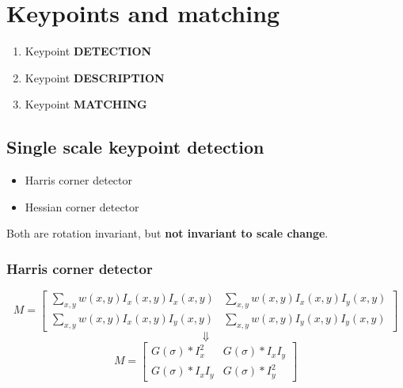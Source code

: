 \documentclass{article}
\begin{document}

    \newpage

\section{Keypoints and matching}
\begin{enumerate}
    \item Keypoint \textbf{DETECTION}
    \item Keypoint \textbf{DESCRIPTION}
    \item Keypoint \textbf{MATCHING}
\end{enumerate}

    \subsection{Single scale keypoint detection}
    \begin{itemize}
        \item Harris corner detector
        \item Hessian corner detector
    \end{itemize}

    Both are rotation invariant, but \textbf{not invariant to scale change}.
    
    \subsubsection{Harris corner detector}
    \[
        M = \begin{bmatrix}
            \sum_{x, y}{w(x, y) I_x(x, y) I_x(x, y)} & \sum_{x, y}{w(x, y) I_x(x, y) I_y(x, y)} \\
            \sum_{x, y}{w(x, y) I_x(x, y) I_y(x, y)} & \sum_{x, y}{w(x, y) I_y(x, y) I_y(x, y)}
        \end{bmatrix}
        \]
        \[
            \Downarrow
            \]
            \[
                M = \begin{bmatrix}
                    G(\sigma) * I^{2}_{x} & G(\sigma) * I_x I_y \\
                    G(\sigma) * I_x I_y & G(\sigma) * I^{2}_y
                \end{bmatrix}
        \]
\end{document}
